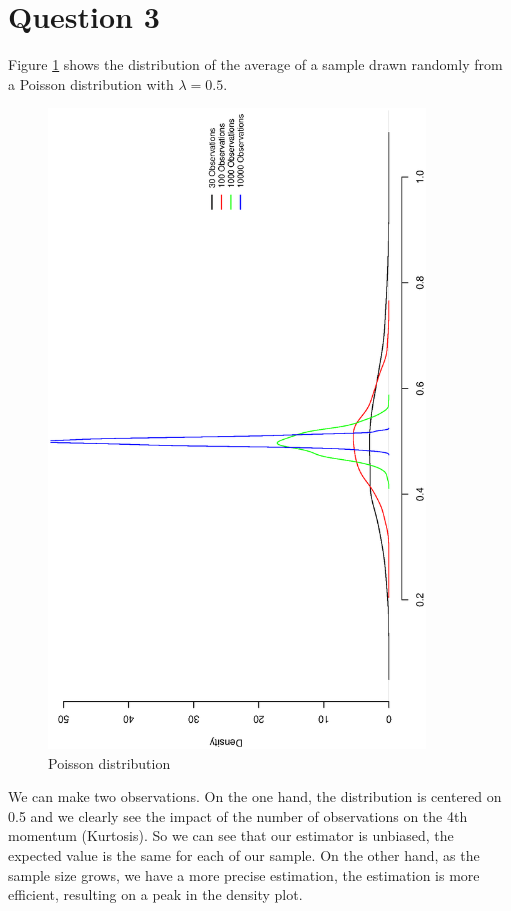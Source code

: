 \section{Question 3}

Figure \ref{fig1} shows the distribution of the average of a sample drawn randomly from a Poisson distribution with $\lambda=0.5$.
\begin{figure}[ht]
\centering
\includegraphics[width=10cm, angle=270]{Q1_3plot.eps}
\caption{Poisson distribution}
\label{fig1}
\end{figure}
We can make two observations. On the one hand, the distribution is centered on 0.5 and we clearly see the impact of the number of observations on the 4th momentum (Kurtosis). So we can see that our estimator is unbiased, the expected value is the same for each of our sample. On the other hand, as the sample size grows, we have a more precise estimation, the estimation is more efficient, resulting on a peak in the density plot. 

